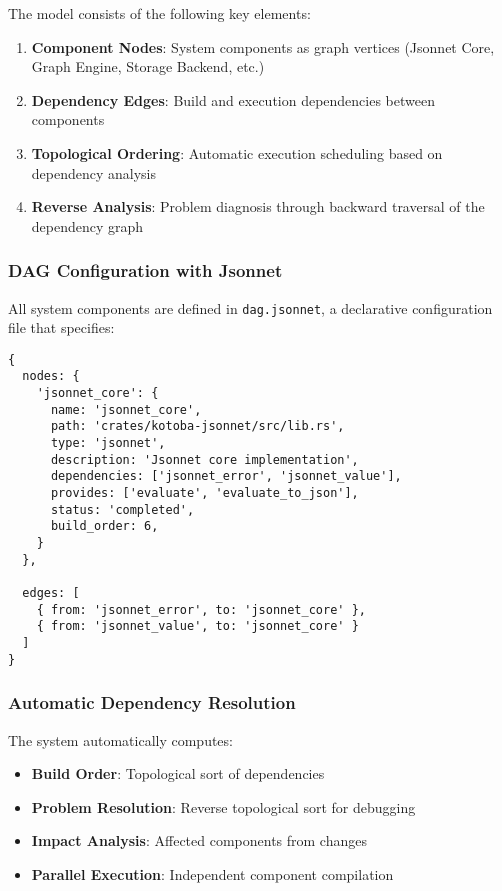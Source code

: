 \documentclass[11pt,a4paper]{article}
\begin{document}
The model consists of the following key elements:

\begin{enumerate}
\item \textbf{Component Nodes}: System components as graph vertices (Jsonnet Core, Graph Engine, Storage Backend, etc.)
\item \textbf{Dependency Edges}: Build and execution dependencies between components
\item \textbf{Topological Ordering}: Automatic execution scheduling based on dependency analysis
\item \textbf{Reverse Analysis}: Problem diagnosis through backward traversal of the dependency graph
\end{enumerate}

\subsubsection{DAG Configuration with Jsonnet}
\label{subsubsec:dag_config}

All system components are defined in \texttt{dag.jsonnet}, a declarative configuration file that specifies:

\begin{lstlisting}[language=jsonnet,caption=Example dag.jsonnet configuration]
{
  nodes: {
    'jsonnet_core': {
      name: 'jsonnet_core',
      path: 'crates/kotoba-jsonnet/src/lib.rs',
      type: 'jsonnet',
      description: 'Jsonnet core implementation',
      dependencies: ['jsonnet_error', 'jsonnet_value'],
      provides: ['evaluate', 'evaluate_to_json'],
      status: 'completed',
      build_order: 6,
    }
  },

  edges: [
    { from: 'jsonnet_error', to: 'jsonnet_core' },
    { from: 'jsonnet_value', to: 'jsonnet_core' }
  ]
}
\end{lstlisting}

\subsubsection{Automatic Dependency Resolution}
\label{subsubsec:dependency_resolution}

The system automatically computes:
\begin{itemize}
\item \textbf{Build Order}: Topological sort of dependencies
\item \textbf{Problem Resolution}: Reverse topological sort for debugging
\item \textbf{Impact Analysis}: Affected components from changes
\item \textbf{Parallel Execution}: Independent component compilation
\end{itemize}
\end{document}
